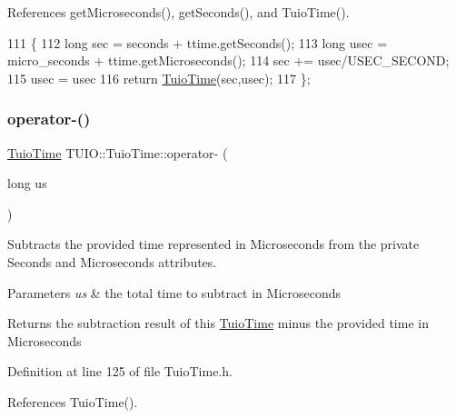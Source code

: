 References get\+Microseconds(), get\+Seconds(), and Tuio\+Time().


\begin{DoxyCode}
111                                            \{
112             \textcolor{keywordtype}{long} sec = seconds + ttime.getSeconds();
113             \textcolor{keywordtype}{long} usec = micro\_seconds + ttime.getMicroseconds();
114             sec += usec/USEC\_SECOND;
115             usec = usec%
116             \textcolor{keywordflow}{return} \hyperlink{class_t_u_i_o_1_1_tuio_time_a924521ecf43b6484fad9550661eedb0a}{TuioTime}(sec,usec);
117         \};
\end{DoxyCode}
\mbox{\label{class_t_u_i_o_1_1_tuio_time_a08d774edb8feaec79f5df44dddaa3a9c}} 
\subsubsection{\texorpdfstring{operator-\/()}{operator-()}\hspace{0.1cm}{\footnotesize\ttfamily [1/2]}}
{\footnotesize\ttfamily \hyperlink{class_t_u_i_o_1_1_tuio_time}{Tuio\+Time} T\+U\+I\+O\+::\+Tuio\+Time\+::operator-\/ (\begin{DoxyParamCaption}\item[{long}]{us }\end{DoxyParamCaption})\hspace{0.3cm}{\ttfamily [inline]}}

Subtracts the provided time represented in Microseconds from the private Seconds and Microseconds attributes.


\begin{DoxyParams}{Parameters}
{\em us} & the total time to subtract in Microseconds \\
\hline
\end{DoxyParams}
\begin{DoxyReturn}{Returns}
the subtraction result of this \hyperlink{class_t_u_i_o_1_1_tuio_time}{Tuio\+Time} minus the provided time in Microseconds 
\end{DoxyReturn}


Definition at line 125 of file Tuio\+Time.\+h.



References Tuio\+Time().


